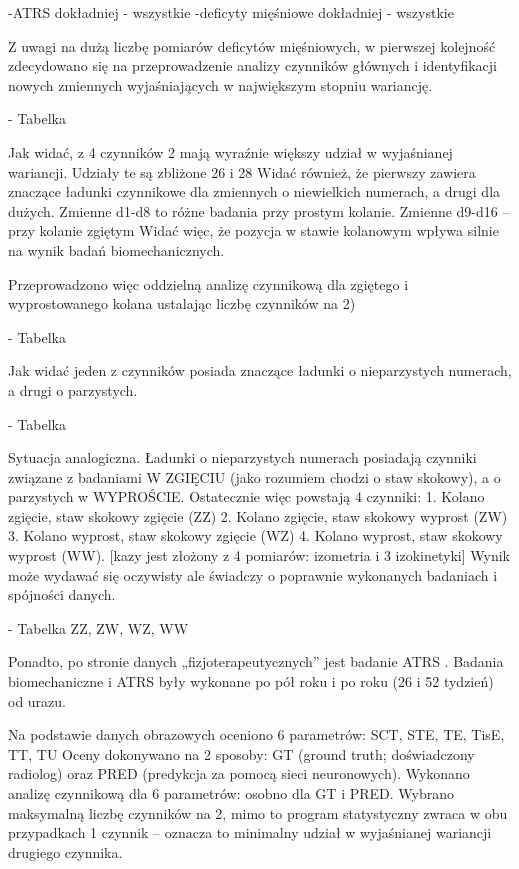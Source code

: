 -ATRS dokładniej - wszystkie
-deficyty mięśniowe dokładniej - wszystkie

Z uwagi na dużą liczbę pomiarów deficytów mięśniowych, w pierwszej kolejność zdecydowano się na przeprowadzenie analizy czynników głównych i identyfikacji nowych zmiennych wyjaśniających w największym stopniu wariancję. 


- Tabelka


Jak widać, z 4 czynników 2 mają wyraźnie większy udział w wyjaśnianej wariancji. Udziały te są zbliżone 26 i 28%
Widać również, że pierwszy zawiera znaczące ładunki czynnikowe dla zmiennych o niewielkich numerach, a drugi dla dużych. Zmienne d1-d8 to różne badania przy prostym kolanie. 
Zmienne d9-d16 – przy kolanie zgiętym Widać więc, że pozycja w stawie kolanowym wpływa silnie na wynik badań biomechanicznych. 

Przeprowadzono więc oddzielną analizę czynnikową dla zgiętego i wyprostowanego kolana ustalając liczbę czynników na 2)

- Tabelka

Jak widać jeden z czynników posiada znaczące ładunki o nieparzystych numerach, a drugi o parzystych. 

- Tabelka

Sytuacja analogiczna. 
Ładunki o nieparzystych numerach posiadają czynniki związane z badaniami W ZGIĘCIU (jako rozumiem chodzi o staw skokowy), a o parzystych w WYPROŚCIE. 
Ostatecznie więc powstają 4 czynniki: 
1. Kolano zgięcie, staw skokowy zgięcie  (ZZ)
2. Kolano zgięcie, staw skokowy wyprost (ZW)
3. Kolano wyprost, staw skokowy zgięcie (WZ)
4. Kolano wyprost, staw skokowy wyprost (WW).
[kazy jest złożony z 4 pomiarów: izometria i 3 izokinetyki]
Wynik może wydawać się oczywisty ale świadczy o poprawnie wykonanych badaniach i spójności danych. 

- Tabelka ZZ, ZW, WZ, WW

Ponadto, po stronie danych „fizjoterapeutycznych” jest badanie ATRS .
Badania biomechaniczne i ATRS były wykonane po pół roku i po roku (26 i 52 tydzień) od urazu. 

Na podstawie danych obrazowych oceniono 6 parametrów: 
SCT, STE, TE, TisE, TT, TU
Oceny dokonywano na 2 sposoby: GT (ground truth; doświadczony radiolog) oraz PRED (predykcja za pomocą sieci neuronowych). 
Wykonano analizę czynnikową dla 6 parametrów: osobno dla GT i PRED. 
Wybrano maksymalną liczbę czynników na 2, mimo to program statystyczny zwraca w obu przypadkach 1 czynnik – oznacza to minimalny udział w wyjaśnianej wariancji drugiego czynnika. 

